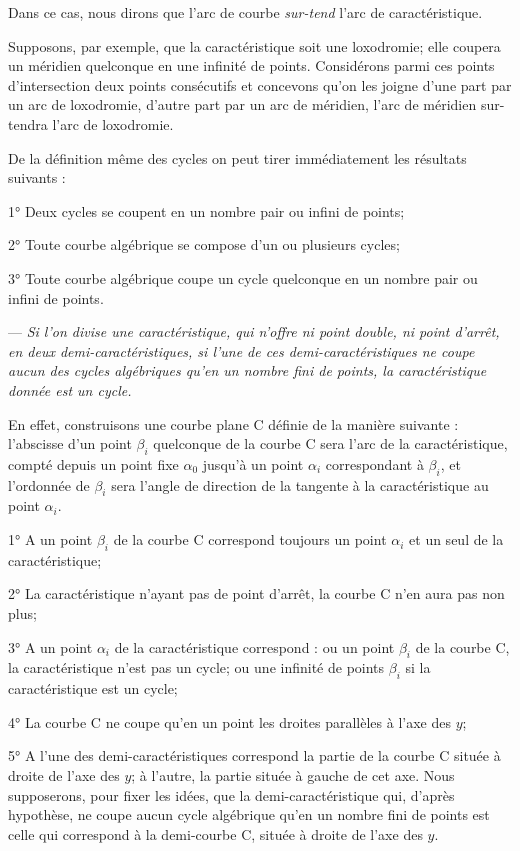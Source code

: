 \documentclass[11pt]{article}
\begin{document}
Dans ce cas, nous dirons que l’arc de courbe \emph{sur-tend} l’arc de caractéristique.

Supposons, par exemple, que la caractéristique soit une loxodromie; elle coupera un méridien quelconque en une infinité de points. Considérons parmi ces points d’intersection deux points consécutifs et concevons qu’on les joigne d’une part par un arc de loxodromie, d’autre part par un arc de méridien, l’arc de méridien sur-tendra l’arc de loxodromie.

De la définition même des cycles on peut tirer immédiatement les résultats suivants :

1° Deux cycles se coupent en un nombre pair ou infini de points;

2° Toute courbe algébrique se compose d’un ou plusieurs cycles;

3° Toute courbe algébrique coupe un cycle quelconque en un nombre pair ou infini de points.

 --- \emph{Si l’on divise une caractéristique, qui n’offre ni point double, ni point d’arrêt, en deux demi-caractéristiques, si l’une de ces demi-caractéristiques ne coupe aucun des cycles algébriques qu’en un nombre fini de points, la caractéristique donnée est un cycle.}

En effet, construisons une courbe plane C définie de la manière suivante : l’abscisse d’un point $\beta_i$ quelconque de la courbe C sera l’arc de la caractéristique, compté depuis un point fixe $\alpha_0$ jusqu’à un point $\alpha_i$ correspondant à $\beta_i$, et l’ordonnée de $\beta_i$ sera l’angle de direction de la tangente à la caractéristique au point $\alpha_i$.

1° A un point $\beta_i$ de la courbe C correspond toujours un point $\alpha_i$ et un seul de la caractéristique;

2° La caractéristique n’ayant pas de point d’arrêt, la courbe C n’en aura pas non plus;

3° A un point $\alpha_i$ de la caractéristique correspond : ou un point $\beta_i$ de la courbe C, la caractéristique n’est pas un cycle; ou une infinité de points $\beta_i$ si la caractéristique est un cycle;

4° La courbe C ne coupe qu’en un point les droites parallèles à l’axe des $y$;

5° A l’une des demi-caractéristiques correspond la partie de la courbe C située à droite de l’axe des $y$; à l’autre, la partie située à gauche de cet axe. Nous supposerons, pour fixer les idées, que la demi-caractéristique qui, d’après hypothèse, ne coupe aucun cycle algébrique qu’en un nombre fini de points est celle qui correspond à la demi-courbe C, située à droite de l’axe des $y$.
\end{document}
